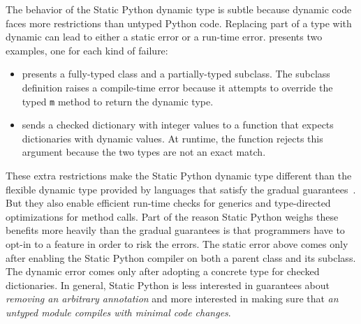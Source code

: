 \documentclass[english,cleveref,submission]{programming}
\newcommand{\SP}{Static Python}
\newcommand{\code}[1]{\texttt{#1}}
\begin{document}
The behavior of the \SP{} dynamic type is subtle because dynamic code
faces more restrictions than untyped Python code.
Replacing part of a type with dynamic can lead to either a static error or
a run-time error.
 presents two examples, one for each kind of failure:
\begin{itemize}
  \item
     presents a fully-typed class and a partially-typed subclass.
    The subclass definition raises a compile-time error because it attempts to override
    the typed \code{m} method to return the dynamic type.

  \item
     sends a checked dictionary with integer values to a
    function that expects dictionaries with dynamic values.
    At runtime, the function rejects this argument because the two types are
    not an exact match.
\end{itemize}
These extra restrictions make the \SP{} dynamic type different than the flexible
dynamic type provided by languages that satisfy the gradual guarantees~\cite{svcb-snapl-2015}.
But they also enable efficient run-time checks for generics and type-directed optimizations
for method calls.
Part of the reason \SP{} weighs these benefits more heavily than the gradual guarantees
is that programmers have to opt-in to a feature in order to risk the errors.
The static error above comes only after enabling the \SP{} compiler on both a parent
class and its subclass.
The dynamic error comes only after adopting a concrete type for checked dictionaries.
In general, \SP{} is less interested in guarantees about \emph{removing
an arbitrary annotation} and more interested in making sure that \emph{an
untyped module compiles with minimal code changes}.
\end{document}
